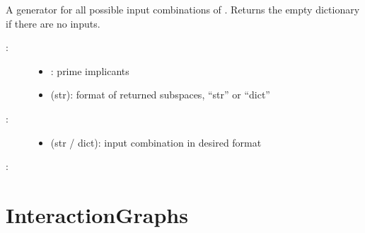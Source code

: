 \documentclass[letterpaper,10pt,english]{sphinxmanual}
\begin{document}
\begin{fulllineitems}
\label{\detokenize{PrimeImplicants:PyBoolNet.PrimeImplicants.input_combinations}}
A generator for all possible input combinations of .
Returns the empty dictionary if there are no inputs.
\begin{description}
\item[{:}] \leavevmode\begin{itemize}
\item {} 
: prime implicants

\item {} 
 (str): format of returned subspaces, “str” or “dict”

\end{itemize}

\item[{:}] \leavevmode\begin{itemize}
\item {} 
 (str / dict): input combination in desired format

\end{itemize}

\end{description}

:

\begin{sphinxVerbatim}[commandchars=\\\{\}]
     
\end{sphinxVerbatim}

\end{fulllineitems}



\section{InteractionGraphs}
\label{\detokenize{InteractionGraphs::doc}}\label{\detokenize{InteractionGraphs:interactiongraphs}}\label{\detokenize{InteractionGraphs:id1}}
\end{document}
